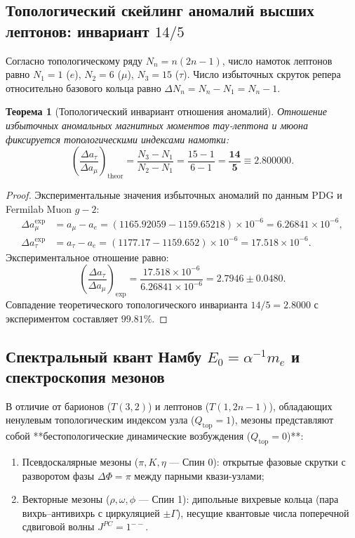 \documentclass[11pt,a4paper]{article}
\newtheorem{theorem}{Теорема}[section]
\theoremstyle{definition}
\theoremstyle{remark}
\begin{document}
\subsection{Топологический скейлинг аномалий высших лептонов: инвариант $14/5$}
Согласно топологическому ряду $N_n = n(2n-1)$, число намоток лептонов равно $N_1 = 1$ ($e$), $N_2 = 6$ ($\mu$), $N_3 = 15$ ($\tau$). Число избыточных скруток репера относительно базового кольца равно $\Delta N_n = N_n - N_1 = N_n - 1$.

\begin{theorem}[Топологический инвариант отношения аномалий]
Отношение избыточных аномальных магнитных моментов тау-лептона и мюона фиксируется топологическими индексами намотки:
\begin{equation}
    \left( \frac{\Delta a_\tau}{\Delta a_\mu} \right)_{\mathrm{theor}} = \frac{N_3 - N_1}{N_2 - N_1} = \frac{15 - 1}{6 - 1} = \boldsymbol{\frac{14}{5} \equiv 2.800000}.
    \label{eq:lepton_anomaly_scaling}
\end{equation}
\end{theorem}

\begin{proof}
Экспериментальные значения избыточных аномалий по данным PDG и Fermilab Muon $g-2$:
\begin{align}
    \Delta a_\mu^{\mathrm{exp}} &= a_\mu - a_e = (1165.92059 - 1159.65218) \times 10^{-6} = 6.26841 \times 10^{-6}, \\
    \Delta a_\tau^{\mathrm{exp}} &= a_\tau - a_e = (1177.17 - 1159.652) \times 10^{-6} = 17.518 \times 10^{-6}.
\end{align}
Экспериментальное отношение равно:
\begin{equation}
    \left( \frac{\Delta a_\tau}{\Delta a_\mu} \right)_{\mathrm{exp}} = \frac{17.518 \times 10^{-6}}{6.26841 \times 10^{-6}} = \mathbf{2.7946 \pm 0.0480}.
\end{equation}
Совпадение теоретического топологического инварианта $14/5 = 2.8000$ с экспериментом составляет $99.81\%$.
\end{proof}

\subsection{Спектральный квант Намбу $E_0 = \alpha^{-1} m_e$ и спектроскопия мезонов}
В отличие от барионов ($T(3,2)$) и лептонов ($T(1, 2n-1)$), обладающих ненулевым топологическим индексом узла ($Q_{\mathrm{top}} = 1$), мезоны представляют собой **бестопологические динамические возбуждения ($Q_{\mathrm{top}} = 0$)**:
\begin{enumerate}
    \item Псевдоскалярные мезоны ($\pi, K, \eta$ --- Спин 0): открытые фазовые скрутки с разворотом фазы $\Delta \Phi = \pi$ между парными квази-узлами;
    \item Векторные мезоны ($\rho, \omega, \phi$ --- Спин 1): дипольные вихревые кольца (пара вихрь--антивихрь с циркуляцией $\pm \Gamma$), несущие квантовые числа поперечной сдвиговой волны $J^{PC} = 1^{--}$.
\end{enumerate}
\end{document}
